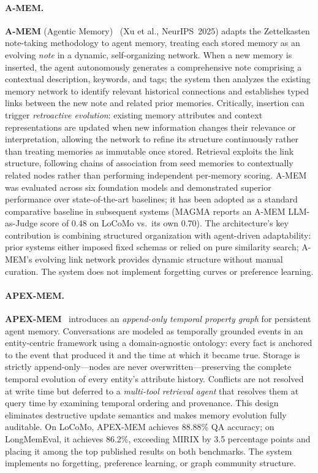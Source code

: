 \paragraph{A-MEM.}
\textbf{A-MEM} (Agentic Memory)~\cite{amem2025} (Xu et al.,
NeurIPS~2025) adapts the Zettelkasten note-taking methodology to agent
memory, treating each stored memory as an evolving \emph{note} in a
dynamic, self-organizing network.  When a new memory is inserted, the
agent autonomously generates a comprehensive note comprising a contextual
description, keywords, and tags; the system then analyzes the existing
memory network to identify relevant historical connections and
establishes typed links between the new note and related prior memories.
Critically, insertion can trigger \emph{retroactive evolution}: existing
memory attributes and context representations are updated when new
information changes their relevance or interpretation, allowing the
network to refine its structure continuously rather than treating
memories as immutable once stored.  Retrieval exploits the link
structure, following chains of association from seed memories to
contextually related nodes rather than performing independent per-memory
scoring.  A-MEM was evaluated across six foundation models and
demonstrated superior performance over state-of-the-art baselines;
it has been adopted as a standard comparative baseline in subsequent
systems (MAGMA reports an A-MEM LLM-as-Judge score of 0.48 on
LoCoMo vs.\ its own 0.70).  The architecture's key contribution is
combining structured organization with agent-driven adaptability:
prior systems either imposed fixed schemas or relied on pure similarity
search; A-MEM's evolving link network provides dynamic structure without
manual curation.  The system does not implement forgetting curves or
preference learning.

\paragraph{APEX-MEM.}
\textbf{APEX-MEM}~\cite{apexmem2026} introduces an
\emph{append-only temporal property graph} for persistent agent memory.
Conversations are modeled as temporally grounded events in an
entity-centric framework using a domain-agnostic ontology:
every fact is anchored to the event that produced it and the time at
which it became true.  Storage is strictly append-only---nodes are
never overwritten---preserving the complete temporal evolution of every
entity's attribute history.  Conflicts are not resolved at write time
but deferred to a \emph{multi-tool retrieval agent} that resolves
them at query time by examining temporal ordering and provenance.
This design eliminates destructive update semantics and makes memory
evolution fully auditable.  On LoCoMo, APEX-MEM achieves 88.88\%
QA accuracy; on LongMemEval, it achieves 86.2\%, exceeding MIRIX by
3.5 percentage points and placing it among the top published results
on both benchmarks.  The system implements no forgetting, preference
learning, or graph community structure.

